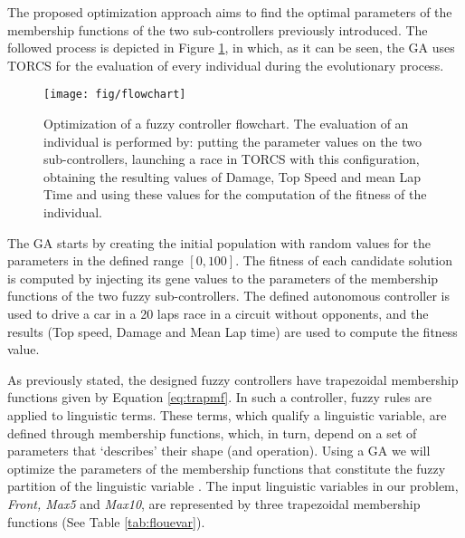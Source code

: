 \documentclass[conference]{IEEEtran}
\begin{document}


The proposed optimization approach aims to find the optimal parameters of the membership functions of the two sub-controllers previously introduced. 
The followed process is depicted in Figure \ref{fig:ga}, in which, as it can be seen, the GA uses TORCS for the evaluation of every individual during the evolutionary process.
\begin{figure}[!ht]
  \label{fig:ga}
  \begin{center}
    \texttt{[image: fig/flowchart]}
  \end{center}
  \caption{Optimization of a fuzzy controller flowchart. The evaluation of an individual is performed by: putting the parameter values on the two sub-controllers, launching a race in TORCS with this configuration, obtaining the resulting values of Damage, Top Speed and mean Lap Time and using these values for the computation of the fitness of the individual.}
\end{figure}	
The GA starts by creating the initial population with random values
for the parameters in the defined range $[0,100]$. The fitness of each
candidate solution is computed by injecting its gene values to the
parameters of the membership functions of the two fuzzy
sub-controllers. The defined autonomous controller is used to drive a
car in a 20 laps race in a circuit without opponents, and the
results (Top speed, Damage and Mean Lap time) are used to compute the
fitness value. 


As previously stated, the designed fuzzy controllers have trapezoidal membership functions given by Equation \ref{eq:trapmf}.
In such a controller, fuzzy rules are applied to linguistic
terms. These terms, which qualify a linguistic variable, are defined
through membership functions, which, in turn, depend on a set of
parameters that `describes' their shape (and operation). Using a GA we
will optimize the parameters of the membership functions that
constitute the fuzzy partition of the linguistic variable
\cite{ThangG08}. The input linguistic variables in our problem,
\textit{Front, Max5} and \textit{Max10}, are represented by three
trapezoidal membership functions (See Table \ref{tab:flouevar}). %
\end{document}
